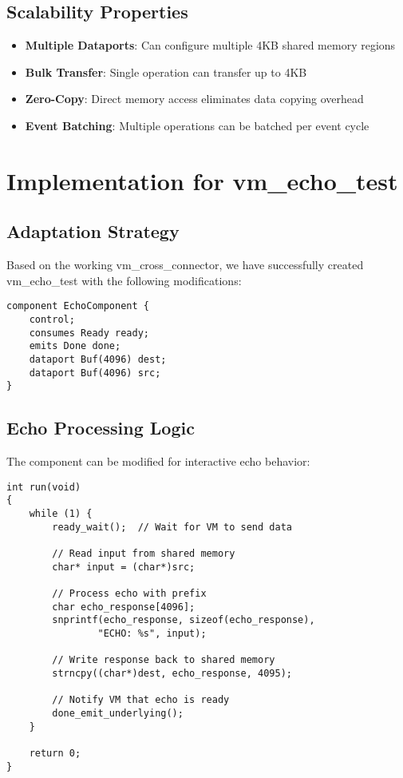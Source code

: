\documentclass[12pt,a4paper]{article}
\begin{document}
\subsection{Scalability Properties}

\begin{itemize}
\item \textbf{Multiple Dataports}: Can configure multiple 4KB shared memory regions
\item \textbf{Bulk Transfer}: Single operation can transfer up to 4KB
\item \textbf{Zero-Copy}: Direct memory access eliminates data copying overhead
\item \textbf{Event Batching}: Multiple operations can be batched per event cycle
\end{itemize}

\section{Implementation for vm\_echo\_test}

\subsection{Adaptation Strategy}

Based on the working vm\_cross\_connector, we have successfully created vm\_echo\_test with the following modifications:

\begin{lstlisting}[style=camkes, caption=Echo component adaptation]
component EchoComponent {
    control;
    consumes Ready ready;
    emits Done done;
    dataport Buf(4096) dest;
    dataport Buf(4096) src;
}
\end{lstlisting}

\subsection{Echo Processing Logic}

The component can be modified for interactive echo behavior:

\begin{lstlisting}[style=camkes, caption=Echo implementation concept]
int run(void)
{
    while (1) {
        ready_wait();  // Wait for VM to send data
        
        // Read input from shared memory
        char* input = (char*)src;
        
        // Process echo with prefix
        char echo_response[4096];
        snprintf(echo_response, sizeof(echo_response), 
                "ECHO: %s", input);
        
        // Write response back to shared memory
        strncpy((char*)dest, echo_response, 4095);
        
        // Notify VM that echo is ready
        done_emit_underlying();
    }
    
    return 0;
}
\end{lstlisting}
\end{document}
